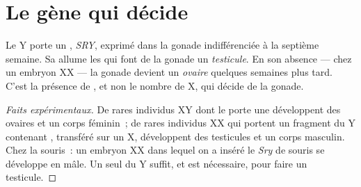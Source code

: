 \section{Le gène qui décide}

\begin{proposition}\label{prop:g11:becoming-male-female:sry}
Le  Y porte un , \emph{SRY}, exprimé dans
la gonade indifférenciée à la septième semaine. Sa  allume les
 qui font de la gonade un \emph{testicule}. En son absence ---
chez un embryon XX --- la gonade devient un \emph{ovaire} quelques
semaines plus tard. C'est la présence de , et non le nombre de
 X, qui décide de la gonade.
\end{proposition}
\begin{proof}[Faits expérimentaux]
De rares individus XY dont le  porte une  développent
des ovaires et un corps féminin~; de rares individus XX qui portent un
fragment du Y contenant , transféré sur un X, développent des
testicules et un corps masculin. Chez la souris~: un embryon XX dans
lequel on a inséré le  \emph{Sry} de souris se développe en mâle.
Un seul  du Y suffit, et est nécessaire, pour faire un testicule.
\end{proof}

